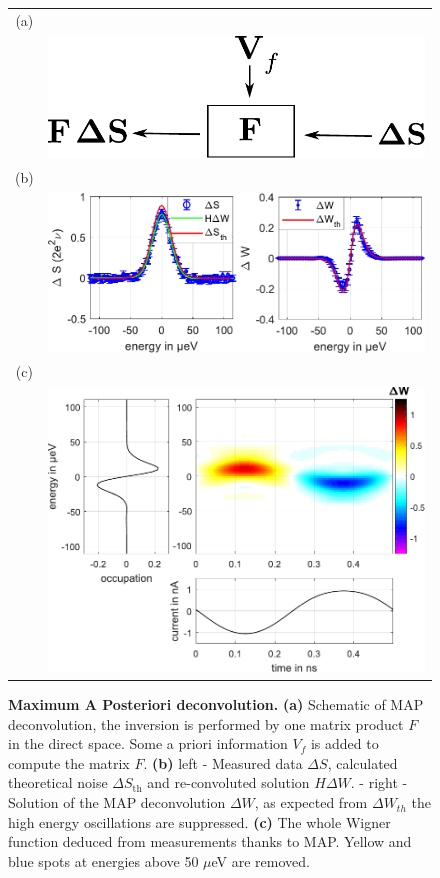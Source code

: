\begin{figure}[hptb]
	\begin{center}
		\begin{tabular}{c c}
			(a) &  \\ 
			
			& \includegraphics[width = 4 cm]{./appA/MAP_deconvolution} \\ 
			
			(b) &  \\ 
			
			& \includegraphics[width = 10 cm]{./appA/MAP_results} \\
			
			(c) &  \\ 
			
			& \includegraphics[width = 10 cm]{./appA/MAP_wigner}
		\end{tabular} 
	\end{center}
	
	\caption{\textbf{Maximum A Posteriori deconvolution.} \textbf{(a)} Schematic of MAP deconvolution, the inversion is performed by one matrix product $F$ in the direct space. Some a priori information $V_{f}$ is added to compute the matrix $F$. \textbf{(b)} left - Measured data $\Delta S$, calculated theoretical noise $\Delta S_{\mathrm{th}}$ and re-convoluted solution $H\Delta W$. - right - Solution of the MAP deconvolution $\Delta W$, as expected from $\Delta W_{th}$ the high energy oscillations are suppressed. \textbf{(c)} The whole Wigner function deduced from measurements thanks to MAP. Yellow and blue spots at energies above 50 $\mu$eV are removed.}
	\label{fig: MAP deconvolution}
\end{figure}


